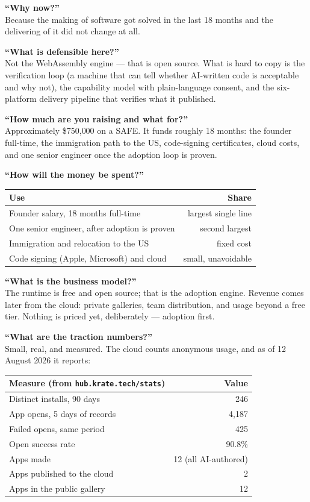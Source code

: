 \documentclass[11pt,a4paper]{report}
\begin{document}
\textbf{``Why now?''}\\
Because the making of software got solved in the last 18 months and the
delivering of it did not change at all.

\textbf{``What is defensible here?''}\\
Not the WebAssembly engine --- that is open source. What is hard to copy
is the verification loop (a machine that can tell whether AI-written code
is acceptable and why not), the capability model with plain-language
consent, and the six-platform delivery pipeline that verifies what it
published.

\textbf{``How much are you raising and what for?''}\\
Approximately \$750{,}000 on a SAFE. It funds roughly 18 months: the
founder full-time, the immigration path to the US, code-signing
certificates, cloud costs, and one senior engineer once the adoption loop
is proven.

\textbf{``How will the money be spent?''}
\begin{center}
\begin{tabular}{lr}
\toprule
\textbf{Use} & \textbf{Share} \\
\midrule
Founder salary, 18 months full-time & largest single line \\
One senior engineer, after adoption is proven & second largest \\
Immigration and relocation to the US & fixed cost \\
Code signing (Apple, Microsoft) and cloud & small, unavoidable \\
\bottomrule
\end{tabular}
\end{center}

\textbf{``What is the business model?''}\\
The runtime is free and open source; that is the adoption engine. Revenue
comes later from the cloud: private galleries, team distribution, and
usage beyond a free tier. Nothing is priced yet, deliberately --- adoption
first.

\textbf{``What are the traction numbers?''}\\
Small, real, and measured. The cloud counts anonymous usage, and as of
12 August 2026 it reports:

\begin{center}
\begin{tabular}{lr}
\toprule
\textbf{Measure (from \texttt{hub.krate.tech/stats})} & \textbf{Value} \\
\midrule
Distinct installs, 90 days & 246 \\
App opens, 5 days of records & 4{,}187 \\
Failed opens, same period & 425 \\
Open success rate & 90.8\% \\
Apps made & 12 (all AI-authored) \\
Apps published to the cloud & 2 \\
Apps in the public gallery & 12 \\
\bottomrule
\end{tabular}
\end{center}
\end{document}
